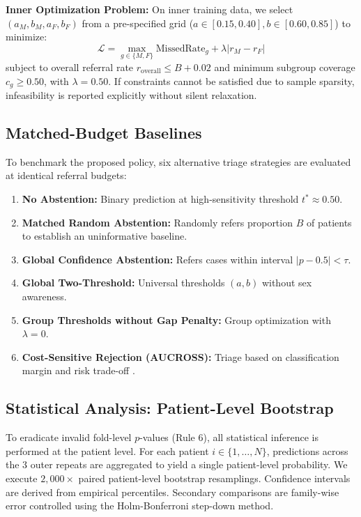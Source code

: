 \documentclass[11pt,a4paper]{article}
\begin{document}
\noindent\textbf{Inner Optimization Problem:} On inner training data, we select $(a_M, b_M, a_F, b_F)$ from a pre-specified grid ($a \in [0.15, 0.40], b \in [0.60, 0.85]$) to minimize:
\begin{equation}
    \mathcal{L} = \max_{g \in \{M, F\}} \text{MissedRate}_g + \lambda |r_M - r_F|
\end{equation}
subject to overall referral rate $r_{\text{overall}} \le B + 0.02$ and minimum subgroup coverage $c_g \ge 0.50$, with $\lambda = 0.50$. If constraints cannot be satisfied due to sample sparsity, infeasibility is reported explicitly without silent relaxation.

\subsection{Matched-Budget Baselines}
To benchmark the proposed policy, six alternative triage strategies are evaluated at identical referral budgets:
\begin{enumerate}
    \item \textbf{No Abstention:} Binary prediction at high-sensitivity threshold $t^* \approx 0.50$.
    \item \textbf{Matched Random Abstention:} Randomly refers proportion $B$ of patients to establish an uninformative baseline.
    \item \textbf{Global Confidence Abstention:} Refers cases within interval $|p - 0.5| < \tau$.
    \item \textbf{Global Two-Threshold:} Universal thresholds $(a, b)$ without sex awareness.
    \item \textbf{Group Thresholds without Gap Penalty:} Group optimization with $\lambda = 0$.
    \item \textbf{Cost-Sensitive Rejection (AUCROSS):} Triage based on classification margin and risk trade-off \cite{pugnana2023auc}.
\end{enumerate}

\subsection{Statistical Analysis: Patient-Level Bootstrap}
To eradicate invalid fold-level $p$-values (Rule 6), all statistical inference is performed at the patient level. For each patient $i \in \{1, \dots, N\}$, predictions across the 3 outer repeats are aggregated to yield a single patient-level probability. We execute $2,000\times$ paired patient-level bootstrap resamplings. Confidence intervals are derived from empirical percentiles. Secondary comparisons are family-wise error controlled using the Holm-Bonferroni step-down method.
\end{document}
